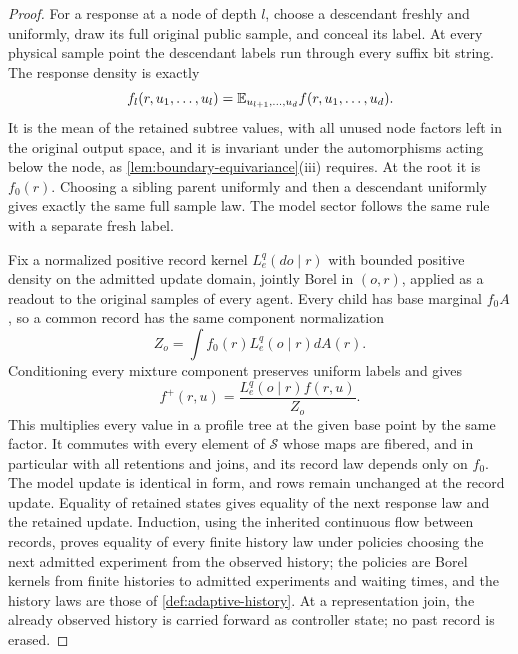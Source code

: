 \begin{proof}
For a response at a node of depth $l$, choose a descendant freshly and uniformly, draw its full original public sample, and conceal its label. At every physical sample point the descendant labels run through every suffix bit string. The response density is exactly
\begin{equation}
 f_l(r,u_1,\ldots,u_l)
 =\mathbb E_{u_{l+1},\ldots,u_d}f(r,u_1,\ldots,u_d).
 \label{eq:boundary-tree-response}
\end{equation}
It is the mean of the retained subtree values, with all unused node factors left in the original output space, and it is invariant under the automorphisms acting below the node, as \cref{lem:boundary-equivariance}(iii) requires. At the root it is $f_0(r)$. Choosing a sibling parent uniformly and then a descendant uniformly gives exactly the same full sample law. The model sector follows the same rule with a separate fresh label.

Fix a normalized positive record kernel $L_e^q(do\mid r)$ with bounded positive density on the admitted update domain, jointly Borel in $(o,r)$, applied as a readout to the original samples of every agent. Every child has base marginal $f_0A$, so a common record has the same component normalization
\begin{equation}
 Z_o=\int f_0(r)L_e^q(o\mid r) dA(r).
\end{equation}
Conditioning every mixture component preserves uniform labels and gives
\begin{equation}
 f^+(r,u)=\frac{L_e^q(o\mid r)f(r,u)}{Z_o}.
 \label{eq:boundary-tree-feedback}
\end{equation}
This multiplies every value in a profile tree at the given base point by the same factor. It commutes with every element of $\mathcal S$ whose maps are fibered, and in particular with all retentions and joins, and its record law depends only on $f_0$. The model update is identical in form, and rows remain unchanged at the record update. Equality of retained states gives equality of the next response law and the retained update. Induction, using the inherited continuous flow between records, proves equality of every finite history law under policies choosing the next admitted experiment from the observed history; the policies are Borel kernels from finite histories to admitted experiments and waiting times, and the history laws are those of \cref{def:adaptive-history}. At a representation join, the already observed history is carried forward as controller state; no past record is erased.
\end{proof}

